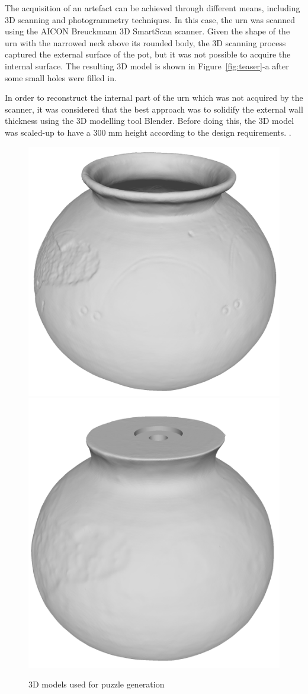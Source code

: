 \documentclass[acmlarge,screen,dvipsnames]{acmart}
\begin{document}
The acquisition of an artefact can be achieved through different
means, including 3D scanning and photogrammetry techniques. In this
case, the urn was scanned using the AICON Breuckmann 3D SmartScan
scanner. Given the shape of the urn with the narrowed neck above its
rounded body, the 3D scanning process captured the external surface of
the pot, but it was not possible to acquire the internal surface. The
resulting 3D model is shown in Figure~\ref{fig:teaser}-a after some
small holes were filled in.

In order to reconstruct the internal part of the urn which was not
acquired by the scanner, it was considered that the best approach was
to solidify the external wall  thickness using the 3D 
modelling tool Blender. Before doing this, the 3D model was scaled-up
to have a 300 mm height according to the design requirements. .
%
\begin{figure}[htb]
  \centering
  {\includegraphics[width=0.45\linewidth]{images/potcomplete}}
  {\includegraphics[width=0.45\linewidth]{images/corewhole}}
  \caption{3D models used for puzzle generation}
\end{figure}
\end{document}
